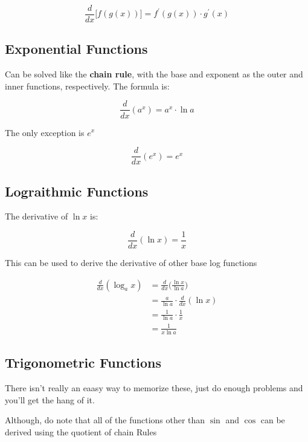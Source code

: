 \documentclass[12pt]{article}
\begin{document}
        \[
                \frac{d}{dx} \bigg[f(g(x))\bigg] = f^{\prime}(g(x)) \cdot g^{\prime}(x)
        \]

        \subsection{Exponential Functions}

        Can be solved like the \textbf{chain rule}, with the base and exponent as the outer and inner
        functions, respectively. The formula is:

        \[
            \frac{d}{dx}(a^x) = a^x \cdot \ln a    
        \]

        \noindent The only exception is $e^x$

        \[
            \frac{d}{dx} (e^x) = e^x   
        \]

        \subsection{Lograithmic Functions}

        The derivative of $\ln x$ is:
        
        \[
            \frac{d}{dx} (\ln x) = \frac{1}{x}  
        \]

        This can be used to derive the derivative of other base log functions

        \[
            \begin{aligned}
                \frac{d}{dx} (\log_a x) &= \frac{d}{dx} \bigg(\frac{\ln x}{\ln a}\bigg) \\
                                        &= \frac{a}{\ln a} \cdot \frac{d}{dx}(\ln x) \\
                                        &= \frac{1}{\ln a} \cdot \frac{1}{x} \\
                                        &= \frac{1}{x\ln a}  
            \end{aligned}
        \]

        \subsection{Trigonometric Functions}

         There isn't really an eaasy way to memorize these, just do enough problems
         and you'll get the hang of it.

         Although, do note that all of the functions other than $\sin$ and $\cos$ can be derived using the 
         quotient of chain Rules
\end{document}
